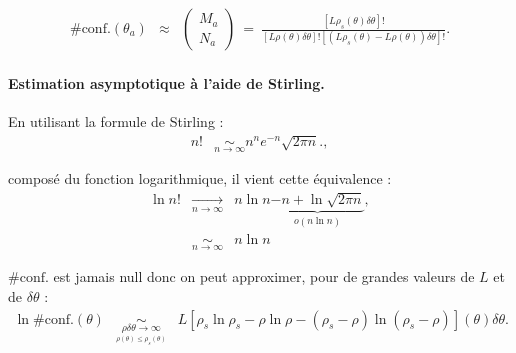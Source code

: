 	
	
	
\begin{eqnarray}
	\# \mbox{conf.}(\theta_a) & \approx  & \left (\begin{array}{c} M_a \\ N_a\end{array} \right ) ~= ~   \frac{[ L\rho_s ( \theta ) \delta \theta ] ! }{ [ L\rho ( \theta ) \delta \theta ] ! [( L\rho_s ( \theta ) - L\rho ( \theta ) )  \delta \theta ] ! }. 	
\end{eqnarray}

\paragraph{Estimation asymptotique à l’aide de Stirling.}

En utilisant la formule de Stirling :
\begin{eqnarray}
	n! & \underset{n \to \infty}{\sim} n^n e^{-n} \sqrt{2\pi n}.,
\end{eqnarray}
	
composé du fonction logarithmique, il vient cette équivalence : 
\begin{eqnarray}
	\ln n! & \underset{n \to \infty}{\rightarrow} & n \ln n \underbrace{- n + \ln \sqrt{2 \pi n }}_{o \left ( n \ln n \right ) } ,\\
	&  \underset{n \to \infty}{\sim} & n \ln n  
\end{eqnarray}
	
$\# \mbox{conf.}$ est jamais null donc on peut approximer, pour de grandes valeurs de $L$ et de $\delta\theta$  : 
\begin{eqnarray}
    \ln \# \mbox{conf.}(\theta) & \underset{\underset{\rho (\theta )\leq  \rho_s (\theta )}{\rho \delta \theta  \to \infty}}{\sim}   & L [ \rho_s\ln \rho_s - \rho \ln \rho - (\rho_s - \rho ) \ln ( \rho_s - \rho) ] (\theta )\delta \theta .
\end{eqnarray}

